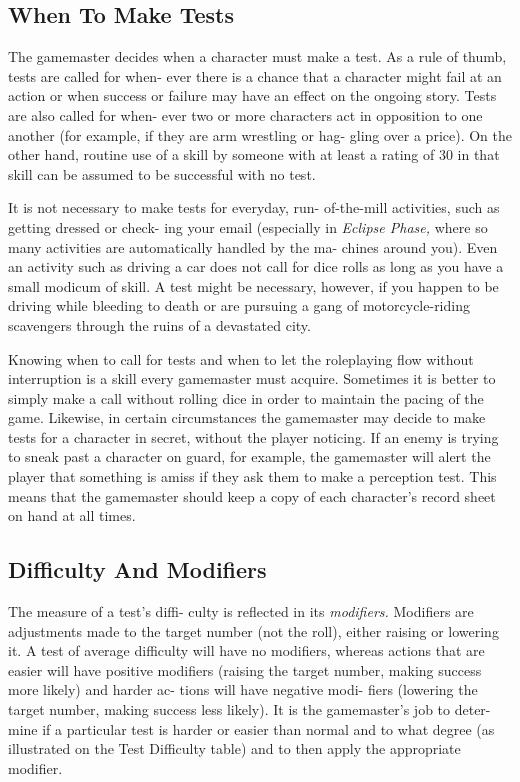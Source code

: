 \subsection{When To Make Tests}

The gamemaster decides when a character must make 
a test. As a rule of thumb, tests are called for when-
ever there is a chance that a character might fail at an 
action or when success or failure may have an effect 
on the ongoing story. Tests are also called for when-
ever two or more characters act in opposition to one 
another (for example, if they are arm wrestling or hag-
gling over a price). On the other hand, routine use of 
a skill by someone with at least a rating of 30 in that 
skill can be assumed to be successful with no test.

It is not necessary to make tests for everyday, run-
of-the-mill activities, such as getting dressed or check-
ing your email (especially in \textit{Eclipse Phase,} where so 
many activities are automatically handled by the ma-
chines around you). Even an activity such as driving 
a car does not call for dice rolls as long as you have 
a small modicum of skill. A test might be necessary, 
however, if you happen to be driving while bleeding 
to death or are pursuing a gang of motorcycle-riding 
scavengers through the ruins of a devastated city.

Knowing when to call for tests and when to let the 
roleplaying flow without interruption is a skill every 
gamemaster must acquire. Sometimes it is better to 
simply make a call without rolling dice in order to 
maintain the pacing of the game. Likewise, in certain 
circumstances the gamemaster may decide to make tests 
for a character in secret, without the player noticing. If 
an enemy is trying to sneak past a character on guard, 
for example, the gamemaster will alert the player that 
something is amiss if they ask them to make a perception 
test. This means that the gamemaster should keep a copy 
of each character's record sheet on hand at all times.

\subsection{Difficulty And Modifiers}

The measure of a test's diffi-
culty is reflected in its \textit{modifiers.} 
Modifiers are adjustments made 
to the target number (not the 
roll), either raising or lowering 
it. A test of average difficulty 
will have no modifiers, whereas 
actions that are easier will have 
positive modifiers (raising the 
target number, making success 
more likely) and harder ac-
tions will have negative modi-
fiers (lowering the target number, 
making success less likely). It is 
the gamemaster's job to deter-
mine if a particular test is harder 
or easier than normal and to 
what degree (as illustrated on the 
Test Difficulty table) and to then 
apply the appropriate modifier.

